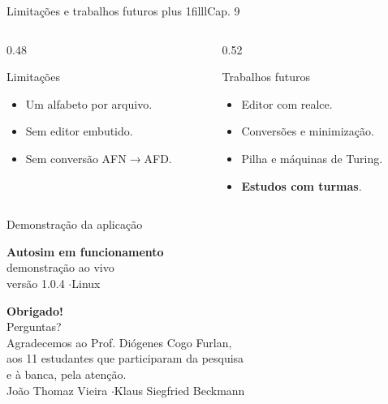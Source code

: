 \documentclass[aspectratio=169,12pt]{beamer}
\newcommand{\notexto}[1]{\hskip 0pt plus 1filll{\normalfont\small\color{white!85!acento}#1}}
\begin{document}
\begin{frame}{Limitações e trabalhos futuros\notexto{Cap. 9}}
  \begin{columns}[T]
    \begin{column}{0.48\textwidth}
      \begin{block}{Limitações}
        \begin{itemize}
          \item Um alfabeto por arquivo.
          \item Sem editor embutido.
          \item Sem conversão AFN$\to$AFD.
        \end{itemize}
      \end{block}
    \end{column}
    \begin{column}{0.52\textwidth}
      \begin{block}{Trabalhos futuros}
        \begin{itemize}
          \item Editor com realce.
          \item Conversões e minimização.
          \item Pilha e máquinas de Turing.
          \item \textbf{Estudos com turmas}.
        \end{itemize}
      \end{block}
    \end{column}
  \end{columns}
\end{frame}

\begin{frame}{Demonstração da aplicação}
  \vfill
  \begin{center}
    {\Huge\bfseries\color{acento} Autosim em funcionamento}\\[16pt]
    {\Large demonstração ao vivo}\\[22pt]
    {\color{gray} versão 1.0.4 \quad$\cdot$\quad Linux}
  \end{center}
  \vfill
\end{frame}

{
\begin{frame}[plain]
  \centering
  \vfill
  {\color{white}\Huge \textbf{Obrigado!}}\\[12pt]
  {\color{white}\Large Perguntas?}\\[22pt]
  {\color{white}Agradecemos ao Prof. Diógenes Cogo Furlan,\\aos 11 estudantes que participaram da pesquisa\\e à banca, pela atenção.}\\[14pt]
  {\color{white!85}João Thomaz Vieira \quad$\cdot$\quad Klaus Siegfried Beckmann}
  \vfill
\end{frame}}
\end{document}
